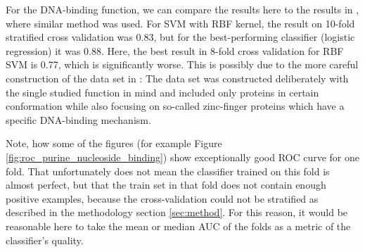 \documentclass[11pt,twoside,a4paper]{book}
\begin{document}
For the DNA-binding function, we can compare the results here to the results in \cite{szabova},
where similar method was used.
For SVM with RBF kernel, the result on 10-fold stratified cross validation was 0.83,
but for the best-performing classifier (logistic regression) it was 0.88.
Here, the best result in 8-fold cross validation for RBF SVM is 0.77,
which is significantly worse. 
This is possibly due to the more careful construction
of the data set in \cite{szabova}: 
The data set was constructed deliberately with the single studied function in mind 
and included only proteins in certain conformation while also
focusing on so-called zinc-finger proteins which have a specific DNA-binding mechanism.

Note, how some of the figures (for example Figure \ref{fig:roc_purine_nucleoside_binding})
show exceptionally good ROC curve for one fold.
That unfortunately does not mean the classifier trained on this fold
is almost perfect, but that the train set in that fold does not contain 
enough positive examples,
because the cross-validation could not be stratified as described in the methodology section \ref{sec:method}.
For this reason, it would be reasonable here to take the mean or median AUC of 
the folds as a metric of the classifier's quality.
\end{document}
